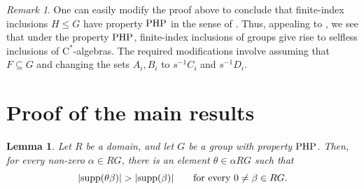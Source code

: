 \documentclass[11pt]{article}
\newtheorem{lem}[thm]{Lemma}
\theoremstyle{definition}
\theoremstyle{remark}
\newtheorem{rem}[thm]{Remark}
\numberwithin{equation}{section}
\numberwithin{equation}{section}
\newcommand{\Cs}{\ensuremath{\mathrm{C}^\ast}}
\numberwithin{equation}{section}
\begin{document}
\begin{rem}
    One can easily modify the proof above to conclude that finite-index inclusions $H\leq G$ have property ${\rm PHP}$ in the sense of \cite{FKOCP26}. Thus, appealing to \cite{FKOCP26}, we see that under the property ${\rm PHP}$, finite-index inclusions of groups give rise to selfless inclusions of \Cs-algebras. The required modifications involve assuming that $F\subseteq G$ and changing the sets $A_i, B_i$ to $s^{-1} C_i$ and $s^{-1}D_i$.
\end{rem}

\section{Proof of the main results}




\begin{lem}\label{exp}
Let $R$ be a domain, and let $G$ be a group with property ${\rm {PHP}}$. Then, for every non-zero $\alpha\in RG$, there is an element $\theta\in\alpha RG$ such that
$$
 |{\rm supp}(\theta\beta)|>|{\rm supp}(\beta)|
 \qquad\text{for every }0\neq\beta\in RG.
$$
\end{lem}
\end{document}
